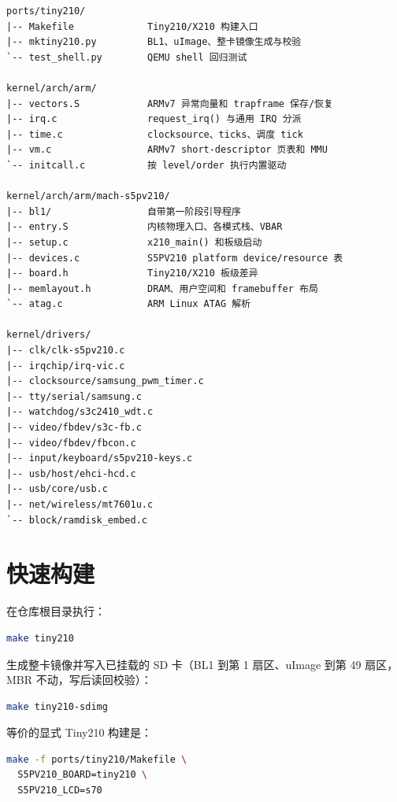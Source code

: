 \begin{lstlisting}
ports/tiny210/
|-- Makefile             Tiny210/X210 构建入口
|-- mktiny210.py         BL1、uImage、整卡镜像生成与校验
`-- test_shell.py        QEMU shell 回归测试

kernel/arch/arm/
|-- vectors.S            ARMv7 异常向量和 trapframe 保存/恢复
|-- irq.c                request_irq() 与通用 IRQ 分派
|-- time.c               clocksource、ticks、调度 tick
|-- vm.c                 ARMv7 short-descriptor 页表和 MMU
`-- initcall.c           按 level/order 执行内置驱动

kernel/arch/arm/mach-s5pv210/
|-- bl1/                 自带第一阶段引导程序
|-- entry.S              内核物理入口、各模式栈、VBAR
|-- setup.c              x210_main() 和板级启动
|-- devices.c            S5PV210 platform device/resource 表
|-- board.h              Tiny210/X210 板级差异
|-- memlayout.h          DRAM、用户空间和 framebuffer 布局
`-- atag.c               ARM Linux ATAG 解析

kernel/drivers/
|-- clk/clk-s5pv210.c
|-- irqchip/irq-vic.c
|-- clocksource/samsung_pwm_timer.c
|-- tty/serial/samsung.c
|-- watchdog/s3c2410_wdt.c
|-- video/fbdev/s3c-fb.c
|-- video/fbdev/fbcon.c
|-- input/keyboard/s5pv210-keys.c
|-- usb/host/ehci-hcd.c
|-- usb/core/usb.c
|-- net/wireless/mt7601u.c
`-- block/ramdisk_embed.c
\end{lstlisting}

\section{快速构建}\label{ux5febux901fux6784ux5efa}

在仓库根目录执行：

\begin{lstlisting}[language=sh]
make tiny210
\end{lstlisting}

生成整卡镜像并写入已挂载的 SD 卡（BL1 到第 1 扇区、uImage 到第 49
扇区，MBR 不动，写后读回校验）：

\begin{lstlisting}[language=sh]
make tiny210-sdimg
\end{lstlisting}

等价的显式 Tiny210 构建是：

\begin{lstlisting}[language=sh]
make -f ports/tiny210/Makefile \
  S5PV210_BOARD=tiny210 \
  S5PV210_LCD=s70
\end{lstlisting}

